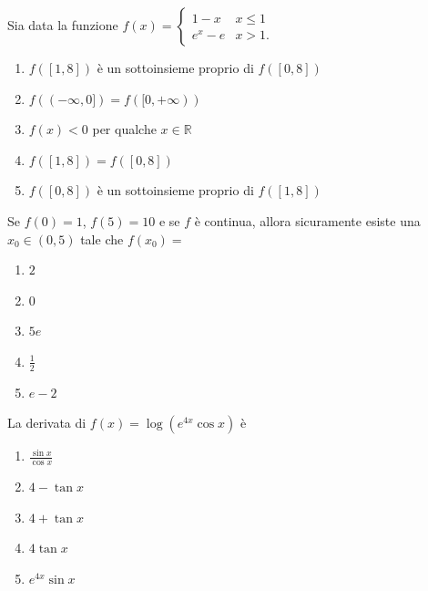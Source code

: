 \begin{quiz}
Sia data la funzione $f(x)=\begin{cases}1-x&x\leq1\\ e^x-e&x>1.\end{cases}$
\begin{enumerate}
\item $f([1,8])$ \`e un sottoinsieme proprio di $f([0,8])$
\item $f(( -\infty,0])=f([0,+\infty))$
\item $f(x)<0$ per qualche $x\in\mathbb R$
\item $f([1,8])=f([0,8])$
\item $f([0,8])$ \`e un sottoinsieme proprio di $f([1,8])$
\end{enumerate}
\end{quiz}

\begin{quiz}
Se $f(0)=1$, $f(5)=10$ e se $f$ \`e continua, allora sicuramente esiste una $x_0\in(0,5)$ tale che $f(x_0)=$
\begin{enumerate}
\item $2$
\item $0$
\item $5e$
\item $\frac12$
\item $e-2$
\end{enumerate}
\end{quiz}

\begin{quiz}
La derivata di $f(x)=\log(e^{4x}\cos x)$ \`e
\begin{enumerate}
\item $\frac{\sin x}{\cos x}$
\item $4-\tan x$
\item $4+\tan x$
\item $4\tan x$
\item $e^{4x}\sin x$
\end{enumerate}
\end{quiz}

